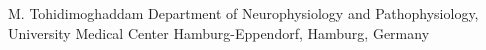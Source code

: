 
                {M.  Tohidimoghaddam}
                {Department of Neurophysiology and Pathophysiology, University Medical Center Hamburg-Eppendorf, Hamburg, Germany}
                